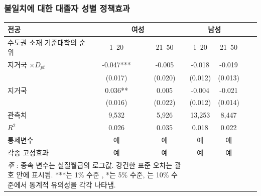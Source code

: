 \documentclass[aspectratio=169,xcolor=dvipsnames,handout]{beamer}
\begin{document}
\begin{frame}
    \frametitle{불일치에 대한 대졸자 성별 정책효과}
    \begin{table}[ht]
        \tiny
        \centering
        \begin{tabular}{lcccccc}
        \toprule
        \textbf{전공} & \multicolumn{2}{c}{\textbf{여성}}& \multicolumn{2}{c}{\textbf{남성}} \\
        \midrule                                                                                  
        수도권 소재 기준대학의 순위    & 1--20     & 21--50    & 1--20     & 21--50    \\
        \midrule                                                          
        지거국 $\times D_{pt}$                         & -0.047***  & -0.005    & -0.018  & -0.019 \\
                                                     & (0.017)   & (0.020)   & (0.012)   & (0.013)   \\
        지거국                                         & 0.036** & 0.005 & -0.004 & -0.021 \\
                                                     & (0.016)   & (0.022)   & (0.012)   & (0.014)   \\
        \midrule                                                          
        관측치                                 & 9,532    & 5,926    & 13,253    & 8,447    \\
        $R^2$                                    & 0.026     & 0.035     & 0.018     & 0.022     \\
        통제변수                                     & 예       & 예       & 예       & 예       \\
        각종 고정효과                                          & 예       & 예       & 예       & 예       \\
        \bottomrule
        \multicolumn{3}{p{6cm}}{\tiny\textit{주} : 종속 변수는 실질월급의 로그값. 강건한 표준 오차는 괄호 안에 표시됨. ***는 1\% 수준 , *는 5\% 수준, 는 10\% 수준에서 통계적 유의성을 각각 나타냄.} \\
        \end{tabular}
    \end{table}
\end{frame}
\end{document}
